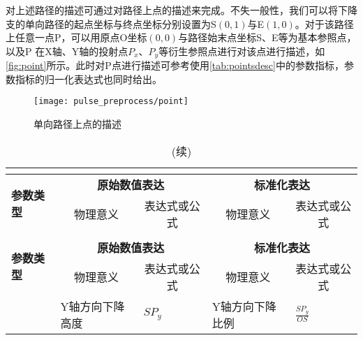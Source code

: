 对上述路径的描述可通过对路径上点的描述来完成。不失一般性，我们可以将下降支的单向路径的起点坐标与终点坐标分别设置为S$(0,1)$与E$(1,0)$。对于该路径上任意一点P，可以用原点O坐标$(0,0)$与路径始末点坐标S、E等为基本参照点，以及P
在X轴、Y轴的投射点$P_x$、$P_y$等衍生参照点进行对该点进行描述，如\autoref{fig:point}所示。此时对P点进行描述可参考使用\autoref{tab:pointsdesc}中的参数指标，参数指标的归一化表达式也同时给出。
\begin{figure}[htbp]
    \centering
    \texttt{[image: pulse\_preprocess/point]}
    \caption{\label{fig:point}单向路径上点的描述}
\end{figure}
\begin{center}
    \fontsize{10}{4}
    \begin{longtable}{m{1.57cm}<{\centering}m{4.07cm}<{\centering}m{2.07cm}<{\centering}m{4.07cm}<{\centering}m{2.07cm}<{\centering}}
		\caption{单向路径上任意一点的描述指标一览}\\
		\label{tab:pointsdesc}\\
		\hline\hline
        \multirow{2}[2]{*}{\textbf{参数类型}} & \multicolumn{2}{c}{\textbf{原始数值表达}} & \multicolumn{2}{c}{\textbf{标准化表达}} \\
            & \multicolumn{1}{c}{物理意义} & \multicolumn{1}{c}{表达式或公式} & \multicolumn{1}{c}{物理意义} & \multicolumn{1}{c}{表达式或公式} \\
        \hline
        \endfirsthead
        \caption[]{(续)}\\
        \hline
        \multirow{2}[2]{*}{\textbf{参数类型}} & \multicolumn{2}{c}{\textbf{原始数值表达}} & \multicolumn{2}{c}{\textbf{标准化表达}} \\
            & \multicolumn{1}{c}{物理意义} & \multicolumn{1}{c}{表达式或公式} & \multicolumn{1}{c}{物理意义} & \multicolumn{1}{c}{表达式或公式} \\
        \hline
        \endhead 
        \hline
        \endfoot
        \hline\hline
        \endlastfoot
                                    & Y轴方向下降高度           &   $SP_y$      &  Y轴方向下降比例     & $\frac{SP_y}{OS}$ \\

\end{longtable}
\end{center}
